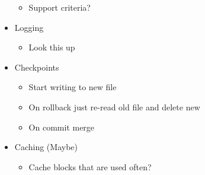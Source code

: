 \documentclass{article}
\begin{document}
\begin{itemize}
        \begin{itemize}
            \item    Support criteria?
        \end{itemize}
    \item   Logging
        \begin{itemize}
            \item   Look this up
        \end{itemize}
    \item   Checkpoints
        \begin{itemize}
            \item    Start writing to new file
            \item    On rollback just re-read old file and delete new
            \item    On commit merge
        \end{itemize}
    \item    Caching (Maybe)
        \begin{itemize}
            \item    Cache blocks that are used often?
        \end{itemize}

\end{itemize}
\end{document}
